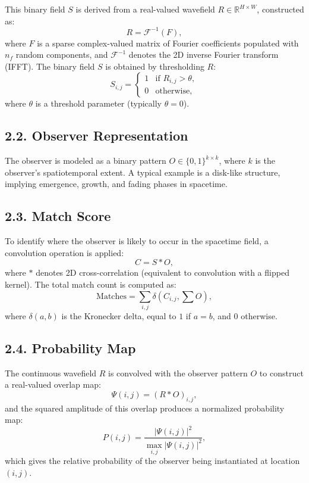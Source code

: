 \documentclass[11pt]{article}
\begin{document}
This binary field $S$ is derived from a real-valued wavefield $R \in \mathbb{R}^{H \times W}$, constructed as:
\begin{equation}
    R = \mathcal{F}^{-1}(F),
\end{equation}
where $F$ is a sparse complex-valued matrix of Fourier coefficients populated with $n_f$ random components, and $\mathcal{F}^{-1}$ denotes the 2D inverse Fourier transform (IFFT). The binary field $S$ is obtained by thresholding $R$:
\begin{equation}
    S_{i,j} =
    \begin{cases}
        1 & \text{if } R_{i,j} > \theta, \\
        0 & \text{otherwise},
    \end{cases}
\end{equation}
where $\theta$ is a threshold parameter (typically $\theta = 0$).

\subsection*{2.2. Observer Representation}

The observer is modeled as a binary pattern $O \in \{0,1\}^{k \times k}$, where $k$ is the observer's spatiotemporal extent. A typical example is a disk-like structure, implying emergence, growth, and fading phases in spacetime.

\subsection*{2.3. Match Score}

To identify where the observer is likely to occur in the spacetime field, a convolution operation is applied:
\begin{equation}
    C = S \ast O,
\end{equation}
where $\ast$ denotes 2D cross-correlation (equivalent to convolution with a flipped kernel). The total match count is computed as:
\begin{equation}
    \text{Matches} = \sum_{i,j} \delta(C_{i,j}, \sum O),
\end{equation}
where $\delta(a,b)$ is the Kronecker delta, equal to $1$ if $a = b$, and $0$ otherwise.

\subsection*{2.4. Probability Map}

The continuous wavefield $R$ is convolved with the observer pattern $O$ to construct a real-valued overlap map:
\begin{equation}
    \Psi(i,j) = (R \ast O)_{i,j},
\end{equation}
and the squared amplitude of this overlap produces a normalized probability map:
\begin{equation}
    P(i,j) = \frac{|\Psi(i,j)|^2}{\max_{i,j} |\Psi(i,j)|^2},
\end{equation}
which gives the relative probability of the observer being instantiated at location $(i,j)$.
\end{document}
